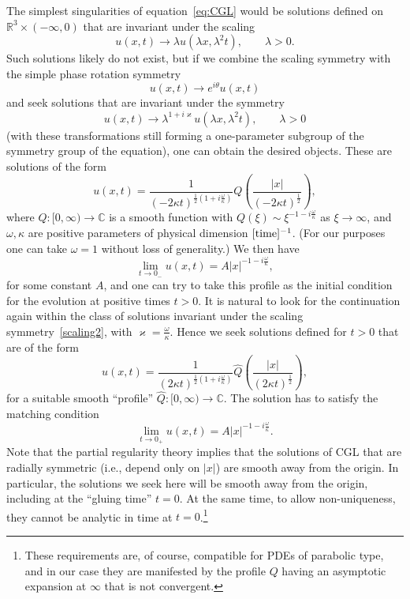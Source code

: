 \documentclass[11pt]{article}
\newcommand{\om}{\omega}
\newcommand{\RR}{\mathbb R}
\begin{document}
The simplest singularities of equation~\eqref{eq:CGL} would be
solutions defined on \(\RR^{3}\times(-\infty,0)\) that are invariant
under the scaling
\begin{equation*}
  u(x,t)\to\lambda u(\lambda x,\lambda^{2} t),\qquad \lambda>0.
\end{equation*}
Such solutions likely do not exist, but if we combine the scaling
symmetry with the simple phase rotation symmetry
\begin{equation*}
  u(x,t)\to e^{i\theta} u(x,t)
\end{equation*}
and seek solutions that are invariant under the symmetry
\begin{equation}\label{scaling2}
  u(x,t)\to\lambda^{1+i\varkappa}u(\lambda x,\lambda^{2}t),\qquad\lambda>0
\end{equation}
(with these transformations still forming a one-parameter subgroup of
the symmetry group of the equation), one can obtain the desired
objects. These are solutions of the form
\begin{equation}\label{eq:CGL-backward}
  u(x, t) = \frac{1}{(-2\kappa t)^{\frac{1}{2}\left(1 + i \frac{\omega}{\kappa}\right)}}
  Q\left(\frac{|x|}{(-2\kappa t)^{\frac{1}{2}}}\right),
\end{equation}
where \(Q\colon [0,\infty)\to \mathbb{C}\) is a smooth function with
\(Q(\xi)\sim \xi^{-1-i\frac{\omega}{\kappa}}\) as \(\xi\to\infty\),
and \(\omega,\kappa\) are positive parameters of physical dimension
\([\textup{time}]^{-1}\). (For our purposes one can take \(\om=1\)
without loss of generality.) We then have
\begin{equation*}
  \lim_{t\to 0_-} u(x,t)= A|x|^{-1-i\frac{\om}{\kappa}},
\end{equation*}
for some constant \(A\), and one can try to take this profile as the
initial condition for the evolution at positive times \(t>0\). It is
natural to look for the continuation again within the class of
solutions invariant under the scaling symmetry~\eqref{scaling2}, with
\(\varkappa=\frac{\om}{\kappa}\). Hence we seek solutions defined for
\(t>0\) that are of the form
\begin{equation}\label{eq:CGL-forward}
  u(x, t) = \frac{1}{(2\kappa t)^{\frac{1}{2}\left(1 + i \frac{\om}{\kappa}\right)}}
  \hat{Q}\left(\frac{|x|}{(2\kappa t)^{\frac{1}{2}}}\right),
\end{equation}
for a suitable smooth ``profile''
\(\hat{Q}\colon[0,\infty)\to\mathbb{C}\). The solution has to satisfy
the matching condition
\begin{equation*}
  \lim_{t\to 0_+} u(x,t)= A|x|^{-1-i\frac{\om}{\kappa}}.
\end{equation*}
Note that the partial regularity theory implies that the solutions of
CGL that are radially symmetric (i.e., depend only on \(|x|\)) are
smooth away from the origin. In particular, the solutions we seek here
will be smooth away from the origin, including at the ``gluing time''
\(t=0\). At the same time, to allow non-uniqueness, they cannot be
analytic in time at \(t=0\).\footnote{These requirements are, of
  course, compatible for PDEs of parabolic type, and in our case they
  are manifested by the profile \(Q\) having an asymptotic expansion
  at \(\infty\) that is not convergent.}
\end{document}
